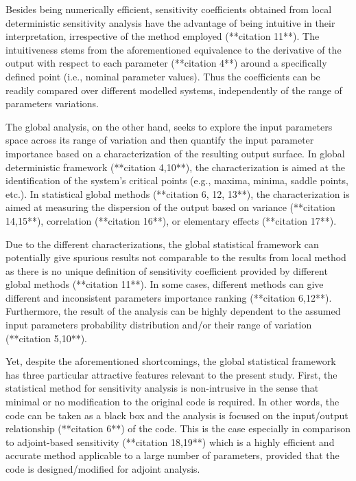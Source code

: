 Besides being numerically efficient, 
sensitivity coefficients obtained from local deterministic sensitivity analysis have the advantage of being intuitive in their interpretation, 
irrespective of the method employed (**citation 11**). 
The intuitiveness stems from the aforementioned equivalence to the derivative of the output with respect to each parameter (**citation 4**) around a specifically defined point (i.e., nominal parameter values). 
Thus the coefficients can be readily compared over different modelled systems, independently of the range of parameters variations.

The global analysis, on the other hand, 
seeks to explore the input parameters space across its range of variation 
and then quantify the input parameter importance based on a characterization of the resulting output surface. 
In global deterministic framework (**citation 4,10**), 
the characterization is aimed at the identification of the system’s critical points (e.g., maxima, minima, saddle points, etc.). 
In statistical global methods (**citation 6, 12, 13**), 
the characterization is aimed at measuring the dispersion of the output based on variance (**citation 14,15**), 
correlation (**citation 16**), or elementary effects (**citation 17**).

Due to the different characterizations, 
the global statistical framework can potentially give spurious results not comparable to the results from local method 
as there is no unique definition of sensitivity coefficient provided by different global methods (**citation 11**). 
In some cases, different methods can give different and inconsistent parameters importance ranking (**citation 6,12**). 
Furthermore, the result of the analysis can be highly dependent to the assumed input parameters probability distribution and/or their range of variation (**citation 5,10**).

Yet, despite the aforementioned shortcomings, 
the global statistical framework has three particular attractive features relevant to the present study. 
First, the statistical method for sensitivity analysis is non-intrusive in the sense that minimal or no modification to the original code is required. 
In other words, the code can be taken as a black box and the analysis is focused on the input/output relationship (**citation 6**) of the code. 
This is the case especially in comparison to adjoint-based sensitivity (**citation 18,19**) which is a highly efficient and accurate method applicable to a large number of parameters, 
provided that the code is designed/modified for adjoint analysis. 

